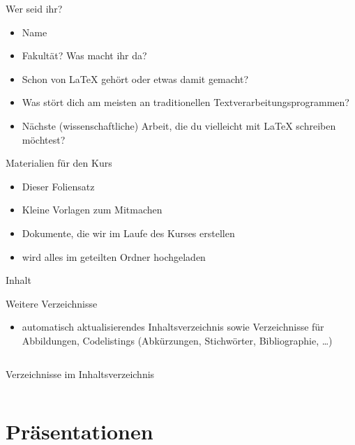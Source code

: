 \documentclass[presentation,aspectratio=169]{beamer}
\begin{document}

\begin{frame}{Wer seid ihr?}
  \begin{itemize}
    \item Name
    \item Fakultät? Was macht ihr da?
    \item Schon von \LaTeX{} gehört oder etwas damit gemacht?
    \item Was stört dich am meisten an traditionellen Textverarbeitungsprogrammen?
    \item Nächste (wissenschaftliche) Arbeit, die du vielleicht mit \LaTeX{} schreiben möchtest?
  \end{itemize}
\end{frame}

\begin{frame}{Materialien für den Kurs}
  \begin{itemize}
    \item Dieser Foliensatz
    \item Kleine Vorlagen zum Mitmachen
    \item Dokumente, die wir im Laufe des Kurses erstellen
      \bigskip
    \item wird alles im geteilten Ordner hochgeladen
  \end{itemize}
\end{frame}

\begin{frame}{Inhalt}
  \tableofcontents
\end{frame}

\begin{frame}[fragile]{Weitere Verzeichnisse}
  \begin{itemize}
    \item automatisch aktualisierendes Inhaltsverzeichnis sowie Verzeichnisse für Abbildungen, Codelistings (Abkürzungen, Stichwörter, Bibliographie, \dots)
  \end{itemize}
  \inputminted{latex}{codebeispiele/list-of-everything.tex}
\end{frame}

\begin{frame}[fragile]{Verzeichnisse im Inhaltsverzeichnis}
  \inputminted{latex}{codebeispiele/lists-in-toc.tex}
\end{frame}

\section{Präsentationen}
\end{document}
